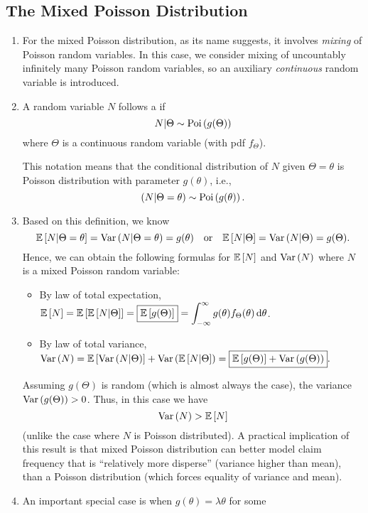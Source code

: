 \subsection{The Mixed Poisson Distribution}
\begin{enumerate}
\item For the mixed Poisson distribution, as its name suggests, it involves
\emph{mixing} of Poisson random variables. In this case, we consider mixing of
uncountably infinitely many Poisson random variables, so an auxiliary
\emph{continuous} random variable is introduced.
\item A random variable \(N\) follows a  if
\[
N|\Theta\sim\operatorname{Poi}\left(g(\Theta)\right)
\]
where \(\Theta\) is a continuous random variable (with pdf \(f_{\Theta}\)).

\begin{note}
This notation means that the conditional distribution of \(N\) given
\(\Theta=\theta\) is Poisson distribution with parameter \(g(\theta)\), i.e.,
\[
(N|\Theta=\theta)\sim\operatorname{Poi}\left(g(\theta)\right).
\]
\end{note}
\item \label{it:mixed-pois-mean-var}
Based on this definition, we know
\[
\expv{N|\Theta=\theta}=\vari{N|\Theta=\theta}=g(\theta)
\qqtext{or}
\expv{N|\Theta}=\vari{N|\Theta}=g(\Theta).
\]
Hence, we can obtain the following formulas for
\(\mathbb{E}\left[N\right]\) and \(\operatorname{Var}\left(N\right)\) where \(N\) is a mixed Poisson random variable:
\begin{itemize}
\item By law of total expectation, \(\displaystyle
\mathbb{E}\left[N\right]=\mathbb{E}\left[\mathbb{E}\left[N|\Theta\right]\right]=\boxed{\mathbb{E}\left[g(\Theta)\right]}
=\int_{-\infty}^{\infty}g(\theta)f_{\Theta}(\theta)\dd{\theta}\).
\item By law of total variance,
\(\displaystyle \operatorname{Var}\left(N\right)=
\mathbb{E}\left[\operatorname{Var}\left(N|\Theta\right)\right]+\operatorname{Var}\left(\mathbb{E}\left[N|\Theta\right]\right)
=\boxed{\mathbb{E}\left[g(\Theta)\right]+\operatorname{Var}\left(g(\Theta)\right)}.
\)
\end{itemize}
\begin{note}
Assuming \(g(\Theta)\) is random (which is almost always the case), the
variance \(\operatorname{Var}\left(g(\Theta)\right)>0\). Thus, in this case we have
\[
\operatorname{Var}\left(N\right)>\mathbb{E}\left[N\right]
\]
(unlike the case where \(N\) is Poisson distributed).  A practical implication
of this result is that mixed Poisson distribution can better model claim
frequency that is ``relatively more disperse'' (variance higher than mean),
than a Poisson distribution (which forces equality of variance and mean).
\end{note}
\item An important special case is when \(g(\theta)=\lambda\theta\) for some

\end{enumerate}
